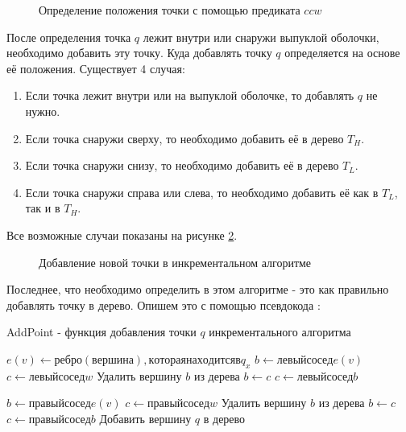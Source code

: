 \begin{figure}[H]
	\centering
	
	\caption{Определение положения точки с помощью предиката $ccw$}
	\label{img:incremental_ccw}
\end{figure}

После определения точка $q$ лежит внутри или снаружи выпуклой оболочки, необходимо добавить эту точку. Куда добавлять точку $q$ определяется на основе её положения. Существует 4 случая:
\begin{enumerate}
	\item Если точка лежит внутри или на выпуклой оболочке, то добавлять $q$ не нужно.
	\item Если точка снаружи сверху, то необходимо добавить её в дерево $T_H$.
	\item Если точка снаружи снизу, то необходимо добавить её в дерево $T_L$.
	\item Если точка снаружи справа или слева, то необходимо добавить её как в $T_L$, так и в $T_H$.
\end{enumerate}

Все возможные случаи показаны на рисунке \ref{img:incremental_newpoint}.

\begin{figure}[H]
	{\centering
		\hfill
		\hfill
		\hfill
		\hfill
		\hfill
	}
	\caption{Добавление новой точки в инкрементальном алгоритме}
	\label{img:incremental_newpoint}
\end{figure}


Последнее, что необходимо определить в этом алгоритме - это как правильно добавлять точку в дерево. Опишем это с помощью псевдокода \cite{incremental2005presentation}:

\begin{algorithm}[H]
	\caption{AddPoint - функция добавления точки $q$ инкрементального алгоритма}
	\label{alg:incremental_addpoint}
	\begin{algorithmic}[1]
		\State $e (v) \gets ребро (вершина), которая находится в q_x$
		\State $b \gets левый сосед e(v)$
		\State $c \gets левый сосед w$
			\State Удалить вершину $b$ из дерева
			\State $b \gets c$
			\State $c \gets левый сосед b$
		\EndWhile
		
		\State $b \gets правый сосед e(v)$
		\State $c \gets правый сосед w$
			\State Удалить вершину $b$ из дерева
			\State $b \gets c$
			\State $c \gets правый сосед b$
		\EndWhile
		\State Добавить вершину $q$ в дерево
		\EndProcedure
	\end{algorithmic}
\end{algorithm}

